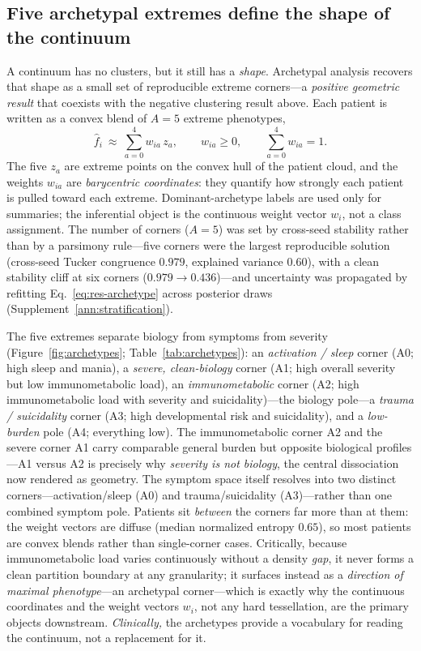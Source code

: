 \subsection{Five archetypal extremes define the shape of the continuum}\label{subsec:archetypes}

A continuum has no clusters, but it still has a \emph{shape}. Archetypal analysis recovers
that shape as a small set of reproducible extreme corners---a \emph{positive geometric
result} that coexists with the negative clustering result above. Each patient is written
as a convex blend of $A=5$ extreme phenotypes,
\begin{equation}
  \hat f_i\ \approx\ \sum_{a=0}^{4} w_{ia}\,z_a,\qquad
  w_{ia}\ge 0,\qquad \sum_{a=0}^{4} w_{ia}=1 .
  \label{eq:res-archetype}
\end{equation}
The five $z_a$ are extreme points on the convex hull of the patient cloud, and the
weights $w_{ia}$ are \emph{barycentric coordinates}: they quantify how strongly each
patient is pulled toward each extreme. Dominant-archetype labels are used only for
summaries; the inferential object is the continuous weight vector $w_i$, not a class
assignment. The number of corners ($A=5$) was set by cross-seed stability rather than by
a parsimony rule---five corners were the largest reproducible solution (cross-seed Tucker
congruence $0.979$, explained variance $0.60$), with a clean stability cliff at six
corners ($0.979\!\to\!0.436$)---and uncertainty was propagated by refitting
Eq.~\eqref{eq:res-archetype} across posterior draws (Supplement~\ref{ann:stratification}).

The five extremes separate biology from symptoms from severity (Figure~\ref{fig:archetypes};
Table~\ref{tab:archetypes}):
an \emph{activation / sleep} corner (A0; high sleep and mania), a \emph{severe,
clean-biology} corner (A1; high overall severity but low immunometabolic load), an
\emph{immunometabolic} corner (A2; high immunometabolic load with severity and
suicidality)---the biology pole---a \emph{trauma / suicidality} corner (A3; high
developmental risk and suicidality), and a \emph{low-burden} pole (A4; everything low).
The immunometabolic corner A2 and the severe corner A1 carry comparable general burden
but opposite biological profiles---A1 versus A2 is precisely why \emph{severity is not
biology}, the central dissociation now rendered as geometry. The symptom space itself
resolves into two distinct corners---activation/sleep (A0) and trauma/suicidality
(A3)---rather than one combined symptom pole. Patients sit \emph{between} the corners far
more than at them: the weight vectors are diffuse (median normalized entropy $0.65$), so
most patients are convex blends rather than single-corner cases. Critically, because
immunometabolic load varies continuously without a density \emph{gap}, it never forms a
clean partition boundary at any granularity; it surfaces instead as a \emph{direction of
maximal phenotype}---an archetypal corner---which is exactly why the continuous
coordinates and the weight vectors $w_i$, not any hard tessellation, are the primary
objects downstream. \emph{Clinically,} the archetypes provide a vocabulary for reading the
continuum, not a replacement for it.

